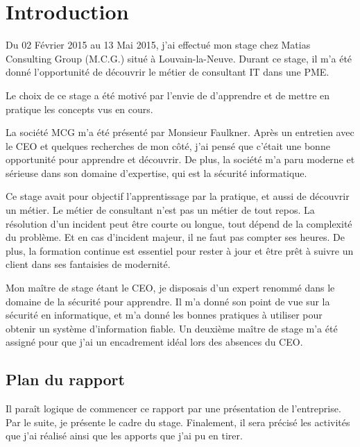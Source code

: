 \chapter*{Introduction}
Du 02 Février 2015 au 13 Mai 2015, j'ai effectué mon stage chez Matias Consulting Group (M.C.G.) situé à Louvain-la-Neuve.
Durant ce stage, il m'a été donné l'opportunité de découvrir le métier de consultant IT dans une PME.

Le choix de ce stage a été motivé par l'envie de d'apprendre et de mettre en pratique les concepts vus en cours.

La société MCG m'a été présenté par Monsieur Faulkner.
Après un entretien avec le CEO et quelques recherches de mon côté, j'ai pensé que c'était une bonne opportunité pour apprendre et découvrir. 
De plus, la société m'a paru moderne et sérieuse dans son domaine d'expertise, qui est la sécurité informatique.

Ce stage avait pour objectif l'apprentissage par la pratique, et aussi de découvrir un métier.
Le métier de consultant n'est pas un métier de tout repos.
La résolution d'un incident peut être courte ou longue, tout dépend de la complexité du problème.
Et en cas d'incident majeur, il ne faut pas compter ses heures.
De plus, la formation continue est essentiel pour rester à jour et être prêt à suivre un client dans ses fantaisies de modernité. 

Mon maître de stage étant le CEO, je disposais d'un expert renommé dans le domaine de la sécurité pour apprendre.
Il m'a donné son point de vue sur la sécurité en informatique, et m'a donné les bonnes pratiques à utiliser pour obtenir un système d'information fiable.
Un deuxième maître de stage m'a été assigné pour que j'ai un encadrement idéal lors des absences du CEO. 

\section*{Plan du rapport}
Il paraît logique de commencer ce rapport par une présentation de l'entreprise.
Par le suite, je présente le cadre du stage.
Finalement, il sera précisé les activités que j'ai réalisé ainsi que les apports que j'ai pu en tirer. 